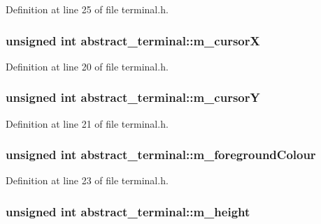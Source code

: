 Definition at line 25 of file terminal.h.

\hypertarget{structabstract__terminal_a02223703fe96837799ccc082b0fcc391}{
\subsubsection[{m\_\-cursorX}]{\setlength{\rightskip}{0pt plus 5cm}unsigned int {\bf abstract\_\-terminal::m\_\-cursorX}}}
\label{structabstract__terminal_a02223703fe96837799ccc082b0fcc391}


Definition at line 20 of file terminal.h.

\hypertarget{structabstract__terminal_a393f6460c238ee68e5ff87e84ed32cad}{
\subsubsection[{m\_\-cursorY}]{\setlength{\rightskip}{0pt plus 5cm}unsigned int {\bf abstract\_\-terminal::m\_\-cursorY}}}
\label{structabstract__terminal_a393f6460c238ee68e5ff87e84ed32cad}


Definition at line 21 of file terminal.h.

\hypertarget{structabstract__terminal_a6767b94d1079244c4555f7addd647b16}{
\subsubsection[{m\_\-foregroundColour}]{\setlength{\rightskip}{0pt plus 5cm}unsigned int {\bf abstract\_\-terminal::m\_\-foregroundColour}}}
\label{structabstract__terminal_a6767b94d1079244c4555f7addd647b16}


Definition at line 23 of file terminal.h.

\hypertarget{structabstract__terminal_a9935a044824cab7418302383c18dc4cc}{
\subsubsection[{m\_\-height}]{\setlength{\rightskip}{0pt plus 5cm}unsigned int {\bf abstract\_\-terminal::m\_\-height}}}
\label{structabstract__terminal_a9935a044824cab7418302383c18dc4cc}


